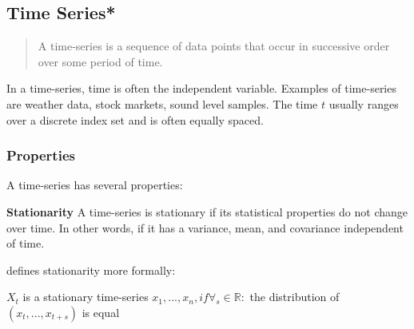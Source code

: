 \subsection{Time Series*}
\label{sec:time-series}
\begin{quote}
  A time-series is a sequence of data
  points that occur in successive order over some period of time.
\end{quote}
\cite{Hayes}

In a time-series, time is often the independent variable.
Examples of time-series are weather data, stock markets, sound level samples.
The time $t$ usually ranges over a discrete index set and is often equally spaced.

\subsubsection{Properties}
A time-series has several properties:


\textbf{Stationarity}
A time-series is stationary if its statistical properties do not change over time.
In other words, if it has a variance, mean, and covariance independent of time.

\cite{RobJHyndman2014} defines stationarity more formally:
\begin{definition}
  $X_t$ is a stationary time-series
  $x_1, ..., x_n, if \forall_s \in \mathbb{R} :$
  the distribution of $(x_t, ..., x_{t+s})$ is equal
\end{definition}

